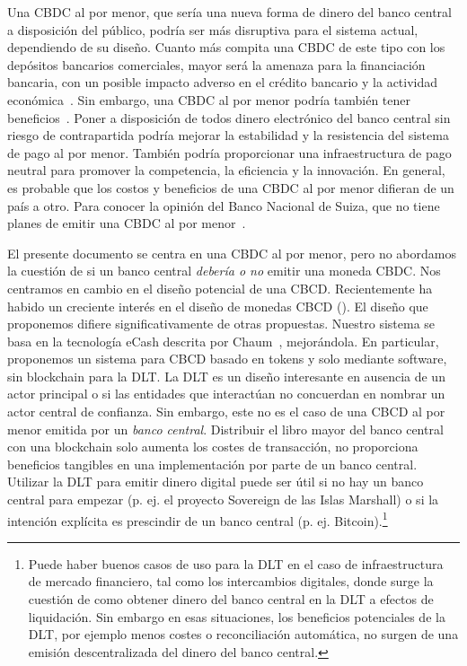 \documentclass[a4paper,10pt]{article} %
\begin{document}
Una CBDC al por menor, que sería una nueva forma de dinero del banco
central a disposición del público, podría ser más disruptiva para el
sistema actual, dependiendo de su diseño. Cuanto más compita una CBDC de
este tipo con los depósitos bancarios comerciales, mayor será la amenaza
para la financiación bancaria, con un posible impacto adverso en el
crédito bancario y la actividad económica~\cite[véase][]{Agur}. Sin
embargo, una CBDC al por menor podría también tener
beneficios~\cite[véase][]{Bordo,Berentsen,Bindseil,Niepelt,Riksbank,BoE}.
Poner a disposición de
todos dinero electrónico del banco central sin riesgo de contrapartida
podría mejorar la estabilidad y la resistencia del sistema de pago al
por menor. También podría proporcionar una infraestructura de pago
neutral para promover la competencia, la eficiencia y la innovación. En
general, es probable que los costos y beneficios de una CBDC al por
menor difieran de un país a otro. Para conocer la opinión del Banco
Nacional de Suiza, que no tiene planes de emitir una CBDC al por
menor~\cite[véase][]{Jordan}.

El presente documento se centra en una CBDC al por menor, pero no abordamos la
cuestión de si un banco central \emph{debería o no} emitir una moneda
CBDC. Nos centramos en cambio en el diseño potencial de una
CBCD. Recientemente ha habido un creciente interés en el diseño de monedas
CBCD (\cite[véase p. ej.][]{Allen,BoE}).  El diseño que proponemos difiere
significativamente de otras propuestas.  Nuestro sistema se basa en la
tecnología eCash descrita por Chaum~\cite{Chaum1983,Chaum1990},
mejorándola. En particular, proponemos un sistema para CBCD basado en tokens y
solo mediante software, sin blockchain para la DLT. La DLT es un diseño
interesante en ausencia de un actor principal o si las entidades que
interactúan no concuerdan en nombrar un actor central de confianza. Sin
embargo, este no es el caso de una CBCD al por menor emitida por un
\emph{banco central}. Distribuir el libro mayor del banco central con una
blockchain solo aumenta los costes de transacción, no proporciona beneficios
tangibles en una implementación por parte de un banco central. Utilizar la DLT
para emitir dinero digital puede ser útil si no hay un banco central para
empezar (p. ej.  el proyecto Sovereign de las Islas Marshall) o si la
intención explícita es prescindir de un banco central
(p. ej. Bitcoin).\footnote{Puede haber buenos casos de uso para la DLT en el
caso de infraestructura de mercado financiero, tal como los intercambios
digitales, donde surge la cuestión de como obtener dinero del banco central en
la DLT a efectos de liquidación. Sin embargo en esas situaciones, los
beneficios potenciales de la DLT, por ejemplo menos costes o reconciliación
automática, no surgen de una emisión descentralizada del dinero del banco
central.}
\end{document}

